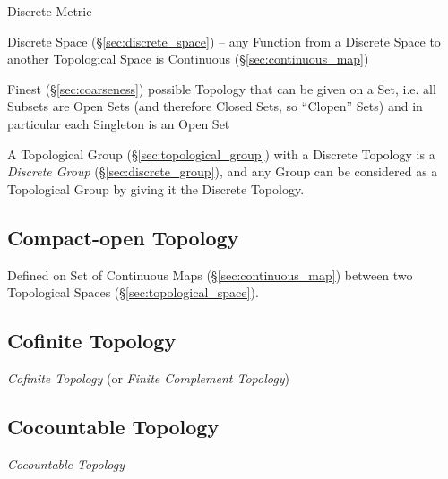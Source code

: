 Discrete Metric

Discrete Space (\S\ref{sec:discrete_space}) -- any Function from a Discrete
Space to another Topological Space is Continuous (\S\ref{sec:continuous_map})

Finest (\S\ref{sec:coarseness}) possible Topology that can be given on a Set,
i.e. all Subsets are Open Sets (and therefore Closed Sets, so ``Clopen'' Sets)
and in particular each Singleton is an Open Set

A Topological Group (\S\ref{sec:topological_group}) with a Discrete Topology is
a \emph{Discrete Group} (\S\ref{sec:discrete_group}), and any Group can be
considered as a Topological Group by giving it the Discrete Topology.



\subsection{Compact-open Topology}\label{sec:compact_open}

Defined on Set of Continuous Maps (\S\ref{sec:continuous_map}) between
two Topological Spaces (\S\ref{sec:topological_space}).



\subsection{Cofinite Topology}\label{sec:cofinite_topology}

\emph{Cofinite Topology} (or \emph{Finite Complement Topology})



\subsection{Cocountable Topology}\label{sec:cocountable_topology}

\emph{Cocountable Topology}



